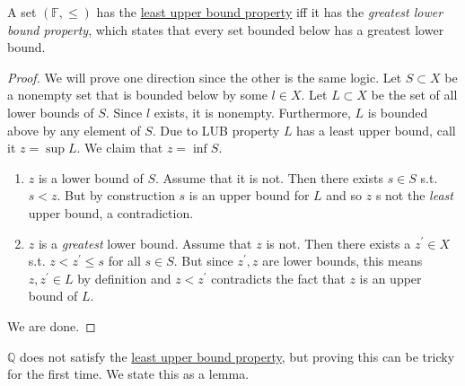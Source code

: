   \begin{theorem}
    \label{thm:lub-is-equivalent-to-glb}
    A set $(\mathbb{F}, \leq)$ has the \hyperref[def:least-upper-bound-property]{least upper bound property} iff it has the \textit{greatest lower bound property}, which states that every set bounded below has a greatest lower bound. 
  \end{theorem}
  \begin{proof}
    We will prove one direction since the other is the same logic. Let $S \subset X$ be a nonempty set that is bounded below by some $l \in X$. Let $L \subset X$ be the set of all lower bounds of $S$. Since $l$ exists, it is nonempty. Furthermore, $L$ is bounded above by any element of $S$. Due to LUB property $L$ has a least upper bound, call it $z = \sup{L}$. We claim that $z = \inf{S}$. 
    \begin{enumerate}
      \item $z$ is a lower bound of $S$. Assume that it is not. Then there exists $s \in S$ s.t. $s < z$. But by construction $s$ is an upper bound for $L$ and so $z$ s not the \textit{least} upper bound, a contradiction. 
      \item $z$ is a \textit{greatest} lower bound. Assume that $z$ is not. Then there exists a $z^\prime \in X$ s.t. $z < z^\prime \leq s$ for all $s \in S$. But since $z^\prime, z$ are lower bounds, this means $z, z^\prime \in L$ by definition and $z < z^\prime$ contradicts the fact that $z$ is an upper bound of $L$. 
    \end{enumerate}
    We are done. 
  \end{proof}

  $\mathbb{Q}$ does not satisfy the \hyperref[def:least-upper-bound-property]{least upper bound property}, but proving this can be tricky for the first time. We state this as a lemma. 

